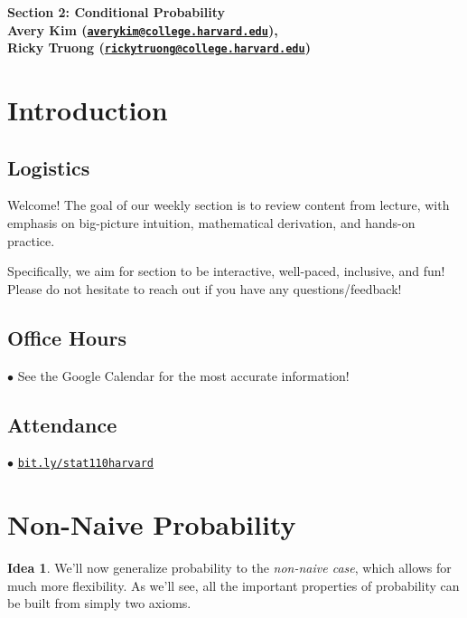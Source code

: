\documentclass[12pt,oneside]{article}
\theoremstyle{definition}
\newtheorem*{idea}{Idea}
\theoremstyle{remark}
\begin{document}
\pagestyle{fancy}
\begin{center}
\bf \Large
Section 2: Conditional Probability \\[0.5em]
\normalsize
Avery Kim (\href{mailto:averykim@college.harvard.edu}{\texttt{averykim@college.harvard.edu}}), \\[0.2em]
Ricky Truong (\href{mailto:rickytruong@college.harvard.edu}{\texttt{rickytruong@college.harvard.edu}})
\end{center}

\section{Introduction}

\subsection{Logistics}

Welcome! The goal of our weekly section is to review content from lecture, with emphasis on big-picture intuition, mathematical derivation, and hands-on practice.

Specifically, we aim for section to be interactive, well-paced, inclusive, and fun! Please do not hesitate to reach out if you have any questions/feedback!

\subsection{Office Hours}

$\bullet$ See the Google Calendar for the most accurate information!

\subsection{Attendance}

$\bullet$ \href{https://bit.ly/stat110harvard}{\texttt{bit.ly/stat110harvard}}

\section{Non-Naive Probability}

\begin{idea}
We'll now generalize probability to the \textit{non-naive case}, which allows for much more flexibility. As we'll see, all the important properties of probability can be built from simply two axioms.
\end{idea}
\end{document}
